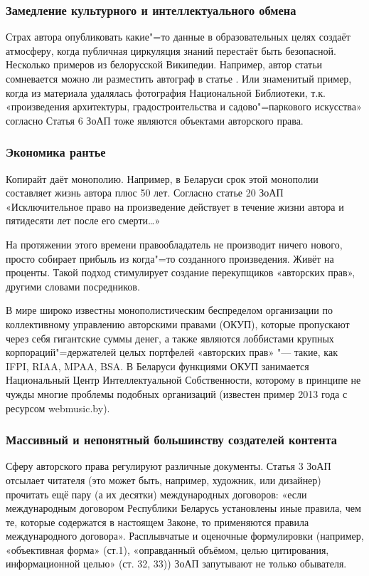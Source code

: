 \documentclass[10pt, a5paper]{article}
\begin{document}
\subsubsection*{Замедление культурного и интеллектуального обмена}

Страх автора опубликовать какие"=то данные в образовательных целях создаёт атмосферу, когда публичная циркуляция знаний перестаёт быть безопасной. Несколько примеров из белорусской Википедии. Например, автор статьи сомневается можно ли разместить автограф в статье \cite{Volchak1}. Или знаменитый пример, когда из материала удалялась фотография Национальной Библиотеки, т.к. «произведения архитектуры, градостроительства и садово"=паркового искусства» согласно Статья 6 ЗоАП тоже являются объектами авторского права. 

\subsubsection*{Экономика рантье}

Копирайт даёт монополию. Например, в Беларуси срок этой монополии составляет жизнь автора плюс 50 лет. Согласно статье 20 ЗоАП «Исключительное право на произведение действует в течение жизни автора и пятидесяти лет после его смерти\ldots{}»

На протяжении этого времени правообладатель не производит ничего нового, просто собирает прибыль из когда"=то созданного произведения. Живёт на проценты. Такой подход стимулирует создание перекупщиков «авторских прав», другими словами посредников.

В мире широко известны монополистическим беспределом организации по коллективному управлению авторскими правами \linebreak(ОКУП), которые пропускают через себя гигантские суммы денег, а также являются лоббистами крупных корпораций"=держателей целых портфелей «авторских прав» "--- такие, как IFPI, RIAA, MPAA, BSA. В Беларуси функциями ОКУП занимается Национальный Центр Интеллектуальной Собственности, которому в принципе не чужды многие проблемы подобных организаций (известен пример 2013 года с ресурсом webmusic.by).

\subsubsection*{Массивный и непонятный большинству создателей контента}

Сферу авторского права регулируют различные документы. \linebreak Статья 3 ЗоАП отсылает читателя (это может быть, например, художник, или дизайнер) прочитать ещё пару (а их десятки) международных договоров: «если международным договором Республики Беларусь установлены иные правила, чем те, которые содержатся в настоящем Законе, то применяются правила международного договора». Расплывчатые и оценочные формулировки (например, «объективная форма» (ст.1), «оправданный объёмом, целью цитирования, информационной целью» (ст. 32, 33)) ЗоАП запутывают не только обывателя.
\end{document}
